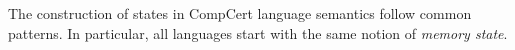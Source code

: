 \documentclass[acmsmall,authordraft]{acmart}
\begin{document}
%

The construction of states in CompCert language semantics
follow common patterns.
In particular,
all languages start with
the same notion of \emph{memory state}.

\end{document}

